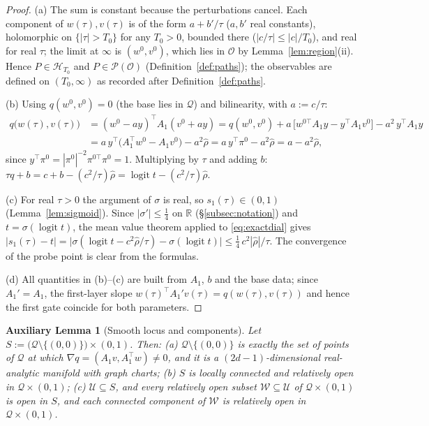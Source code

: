 \documentclass[11pt]{article}
\theoremstyle{definition}
\theoremstyle{remark}
\theoremstyle{plain}
\newtheorem{auxlemma}{Auxiliary Lemma}
\newcommand{\R}{\mathbb{R}}
\newcommand{\cO}{\mathcal{O}}
\newcommand{\cP}{\mathcal{P}}
\newcommand{\cQ}{\mathcal{Q}}
\newcommand{\cU}{\mathcal{U}}
\newcommand{\cH}{\mathcal{H}}
\newcommand{\cW}{\mathcal{W}}
\newcommand{\logit}{\operatorname{logit}}
\newcommand{\sig}{\sigma}
\begin{document}
\begin{proof}
(a)  The sum is constant because the perturbations cancel.  Each component of
$w(\tau),v(\tau)$ is of the form $a+b'/\tau$ ($a,b'$ real constants), holomorphic on
$\{|\tau|>T_0\}$ for any $T_0>0$, bounded there ($|c/\tau|\le|c|/T_0$), and real for
real $\tau$; the limit at $\infty$ is $(w^0,v^0)$, which lies in $\cO$ by
Lemma~\ref{lem:region}(ii).  Hence $P\in\cH_{T_0}$ and $P\in\cP(\cO)$
(Definition~\ref{def:paths}); the observables are defined on $(T_0,\infty)$ as recorded
after Definition~\ref{def:paths}.

(b)  Using $q(w^0,v^0)=0$ (the base lies in $\cQ$) and bilinearity, with $a:=c/\tau$:
\begin{align*}
q\big(w(\tau),v(\tau)\big)
&=(w^0-ay)^\top A_1(v^0+ay)
=q(w^0,v^0)+a\,\big[w^{0\top}A_1y-y^\top A_1v^0\big]-a^2\,y^\top A_1y\\
&=a\,y^\top\big(A_1^\top w^0-A_1v^0\big)-a^2\hat\rho
=a\,y^\top\pi^0-a^2\hat\rho
=a-a^2\hat\rho,
\end{align*}
since $y^\top\pi^0=|\pi^0|^{-2}\pi^{0\top}\pi^0=1$.  Multiplying by $\tau$ and adding
$b$: $\tau q+b=c+b-(c^2/\tau)\hat\rho=\logit t-(c^2/\tau)\hat\rho$.

(c)  For real $\tau>0$ the argument of $\sig$ is real, so $s_1(\tau)\in(0,1)$
(Lemma~\ref{lem:sigmoid}).  Since $|\sig'|\le\frac14$ on $\R$
(\S\ref{subsec:notation}) and $t=\sig(\logit t)$, the mean value theorem applied to
\eqref{eq:exactdial} gives
$|s_1(\tau)-t|=\big|\sig(\logit t-c^2\hat\rho/\tau)-\sig(\logit t)\big|
\le\frac14\,c^2|\hat\rho|/\tau$.  The convergence of the probe point is clear from the
formulas.

(d)  All quantities in (b)--(c) are built from $A_1$, $b$ and the base data; since
$A_1'=A_1$, the first-layer slope $w(\tau)^\top A_1'v(\tau)=q(w(\tau),v(\tau))$ and
hence the first gate coincide for both parameters.
\end{proof}

\begin{auxlemma}[Smooth locus and components]\label{lem:smooth}
Let $S:=\big(\cQ\setminus\{(0,0)\}\big)\times(0,1)$.  Then:
\textup{(a)} $\cQ\setminus\{(0,0)\}$ is exactly the set of points of $\cQ$ at which
$\nabla q=(A_1v,A_1^\top w)\neq0$, and it is a $(2d-1)$-dimensional real-analytic
manifold with graph charts; \textup{(b)} $S$ is locally connected and relatively open
in $\cQ\times(0,1)$; \textup{(c)} $\cU\subseteq S$, and every relatively open subset
$\cW\subseteq\cU$ of $\cQ\times(0,1)$ is open in $S$, and each connected component of
$\cW$ is relatively open in $\cQ\times(0,1)$.
\end{auxlemma}
\end{document}
